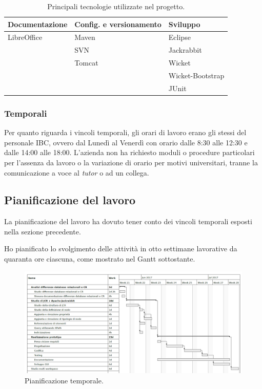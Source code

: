 		\begin{table}[H]
			\centering
			\begin{tabularx}{\textwidth}{|X | X | X |}
				\hline
				\rowcolor{lightgray}
			  \textbf{Documentazione} & 	\textbf{{Config.} e \mbox{versionamento}}  &  \textbf{Sviluppo} \\
				\hline
				 LibreOffice & Maven & Eclipse \\
				\hline
				 & SVN & Jackrabbit \\
				\hline
				 & Tomcat & Wicket \\
				\hline
				& & Wicket-Bootstrap \\
				\hline
				& & JUnit \\
				\hline
			\end{tabularx}
			\caption{Principali tecnologie utilizzate nel progetto.}
		\end{table}
	
	\subsubsection*{Temporali}
		Per quanto riguarda i vincoli temporali, gli orari di lavoro erano gli stessi del personale IBC, ovvero dal Lunedì al Venerdì con orario dalle 8:30 alle 12:30 e dalle 14:00 alle 18:00. L'azienda non ha richiesto moduli o procedure particolari per l'assenza da lavoro o la variazione di orario per motivi universitari, tranne la comunicazione a voce al \textit{tutor} o ad un collega.
		
		
	\subsection{Pianificazione del lavoro}
		La pianificazione del lavoro ha dovuto tener conto dei vincoli temporali esposti nella sezione precedente.
		
		
		Ho pianificato lo svolgimento delle attività in otto settimane lavorative da quaranta ore ciascuna, come mostrato nel Gantt sottostante.
			\begin{figure}[H]
				\centering
				\includegraphics[width=\textwidth]{immagini/gantt-pianificazione}
				\caption{Pianificazione temporale.}
			\end{figure}
		
